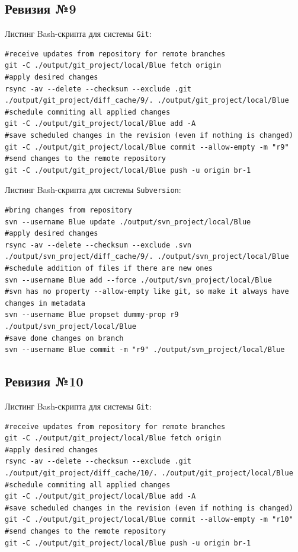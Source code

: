 \subsection{Ревизия №9}

Листинг Bash-скрипта для системы \texttt{Git}:
\begin{lstlisting}
#receive updates from repository for remote branches
git -C ./output/git_project/local/Blue fetch origin
#apply desired changes
rsync -av --delete --checksum --exclude .git ./output/git_project/diff_cache/9/. ./output/git_project/local/Blue
#schedule commiting all applied changes
git -C ./output/git_project/local/Blue add -A
#save scheduled changes in the revision (even if nothing is changed)
git -C ./output/git_project/local/Blue commit --allow-empty -m "r9"
#send changes to the remote repository
git -C ./output/git_project/local/Blue push -u origin br-1
\end{lstlisting}

Листинг Bash-скрипта для системы \texttt{Subversion}:
\begin{lstlisting}
#bring changes from repository
svn --username Blue update ./output/svn_project/local/Blue
#apply desired changes
rsync -av --delete --checksum --exclude .svn ./output/svn_project/diff_cache/9/. ./output/svn_project/local/Blue
#schedule addition of files if there are new ones
svn --username Blue add --force ./output/svn_project/local/Blue
#svn has no property --allow-empty like git, so make it always have changes in metadata
svn --username Blue propset dummy-prop r9 ./output/svn_project/local/Blue
#save done changes on branch
svn --username Blue commit -m "r9" ./output/svn_project/local/Blue
\end{lstlisting}


\subsection{Ревизия №10}

Листинг Bash-скрипта для системы \texttt{Git}:
\begin{lstlisting}
#receive updates from repository for remote branches
git -C ./output/git_project/local/Blue fetch origin
#apply desired changes
rsync -av --delete --checksum --exclude .git ./output/git_project/diff_cache/10/. ./output/git_project/local/Blue
#schedule commiting all applied changes
git -C ./output/git_project/local/Blue add -A
#save scheduled changes in the revision (even if nothing is changed)
git -C ./output/git_project/local/Blue commit --allow-empty -m "r10"
#send changes to the remote repository
git -C ./output/git_project/local/Blue push -u origin br-1
\end{lstlisting}

